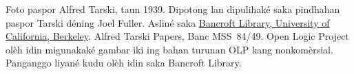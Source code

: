 Foto paspor Alfred Tarski, taun 1939. Dipotong lan dipulihaké
saka pindhahan paspor Tarski déning Joel Fuller. Asliné saka
\href{http://www.lib.berkeley.edu/libraries/bancroft-library}{Bancroft
Library, University of California, Berkeley}. Alfred Tarski Papers,
Banc MSS~84/49. Open Logic Project olèh idin migunakaké gambar iki
ing bahan turunan OLP kang nonkomèrsial. Panganggo liyané kudu
olèh idin saka Bancroft Library.
